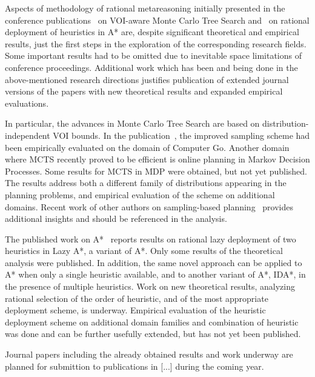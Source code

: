 \documentclass{article}
\begin{document}
Aspects of methodology of rational metareasoning initially
presented in the conference
publications~\cite{TolpinShimony.mcts,HayRussellTolpinShimony.selecting}
on VOI-aware Monte Carlo Tree Search and~\cite{TolpinEtAl.rla}
on rational deployment of heuristics in A* are, despite
significant theoretical and empirical results, just the first
steps in the exploration of the corresponding research fields.
Some important results had to be omitted due to inevitable space
limitations of conference proceedings.  Additional work which
has been and being done in the above-mentioned research directions
justifies publication of extended journal versions of the papers
with new theoretical results and expanded empirical evaluations.  

In particular, the advances in Monte Carlo Tree Search are based on
distribution-independent VOI bounds. In the publication~\cite{HayRussellTolpinShimony.selecting}, the improved
sampling scheme had been empirically evaluated on the domain of
Computer Go.  Another domain where MCTS recently proved to be
efficient is online planning in Markov Decision Processes. Some
results for MCTS in MDP were obtained, but not yet published.
The results address both a different family of distributions
appearing in the planning problems, and empirical evaluation
of the scheme on additional domains. Recent work of other authors
on sampling-based planning~\cite{FeldmanDomshlak.onlinemdp,DomshlakFeldman.uctornot}
provides additional insights and should be referenced in the
analysis. 

The published work on A*~\cite{TolpinEtAl.rla} reports
results on rational lazy deployment
of two heuristics in Lazy A*, a variant of A*. Only some results
of the theoretical analysis were published. In addition, the same
novel approach can be applied to A* when only a single heuristic
available, and to another variant of A*, IDA*, in the presence of
multiple heuristics. Work on new theoretical results, analyzing 
rational selection of the order of heuristic, and of the most
appropriate deployment scheme, is underway. Empirical evaluation
of the heuristic deployment scheme on additional domain families
and combination of heuristic was done and can be further usefully
extended, but has not yet been published.

Journal papers including the already obtained results and work
underway are planned for submittion to publications in [...] during
the coming year.

\maketitle


\end{document}
